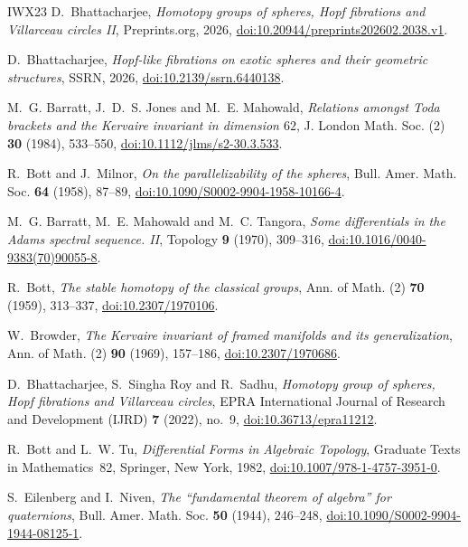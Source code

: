 \begin{thebibliography}{IWX23}
 D.~Bhattacharjee, \emph{Homotopy groups of spheres, Hopf fibrations and Villarceau circles II}, Preprints.org, 2026, \href{https://doi.org/10.20944/preprints202602.2038.v1}{doi:10.20944/preprints202602.2038.v1}.

 D.~Bhattacharjee, \emph{Hopf-like fibrations on exotic spheres and their geometric structures}, SSRN, 2026, \href{https://doi.org/10.2139/ssrn.6440138}{doi:10.2139/ssrn.6440138}.

 M.~G. Barratt, J.~D.~S. Jones and M.~E. Mahowald, \emph{Relations amongst Toda brackets and the Kervaire invariant in dimension $62$}, J. London Math. Soc. (2) \textbf{30} (1984), 533--550, \href{https://doi.org/10.1112/jlms/s2-30.3.533}{doi:10.1112/jlms/s2-30.3.533}.

 R.~Bott and J.~Milnor, \emph{On the parallelizability of the spheres}, Bull. Amer. Math. Soc. \textbf{64} (1958), 87--89, \href{https://doi.org/10.1090/S0002-9904-1958-10166-4}{doi:10.1090/S0002-9904-1958-10166-4}.

 M.~G. Barratt, M.~E. Mahowald and M.~C. Tangora, \emph{Some differentials in the Adams spectral sequence. II}, Topology \textbf{9} (1970), 309--316, \href{https://doi.org/10.1016/0040-9383(70)90055-8}{doi:10.1016/0040-9383(70)90055-8}.

 R.~Bott, \emph{The stable homotopy of the classical groups}, Ann. of Math. (2) \textbf{70} (1959), 313--337, \href{https://doi.org/10.2307/1970106}{doi:10.2307/1970106}.

 W.~Browder, \emph{The Kervaire invariant of framed manifolds and its generalization}, Ann. of Math. (2) \textbf{90} (1969), 157--186, \href{https://doi.org/10.2307/1970686}{doi:10.2307/1970686}.

 D.~Bhattacharjee, S.~Singha Roy and R.~Sadhu, \emph{Homotopy group of spheres, Hopf fibrations and Villarceau circles}, EPRA International Journal of Research and Development (IJRD) \textbf{7} (2022), no.~9, \href{https://doi.org/10.36713/epra11212}{doi:10.36713/epra11212}.

 R.~Bott and L.~W. Tu, \emph{Differential Forms in Algebraic Topology}, Graduate Texts in Mathematics~82, Springer, New York, 1982, \href{https://doi.org/10.1007/978-1-4757-3951-0}{doi:10.1007/978-1-4757-3951-0}.

 S.~Eilenberg and I.~Niven, \emph{The ``fundamental theorem of algebra'' for quaternions}, Bull. Amer. Math. Soc. \textbf{50} (1944), 246--248, \href{https://doi.org/10.1090/S0002-9904-1944-08125-1}{doi:10.1090/S0002-9904-1944-08125-1}.


\end{thebibliography}
